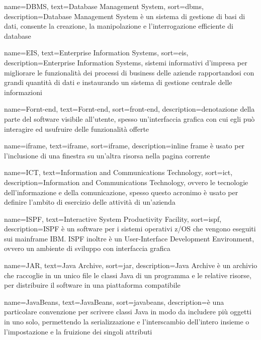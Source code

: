 {
    name=DBMS,
    text=Database Management System,
    sort=dbms,
    description={Database Management System è un sistema di gestione di basi di dati, consente la creazione, la manipolazione e l’interrogazione efficiente di database}
}

{
    name=EIS,
    text=Enterprise Information Systems,
    sort=eis,
    description={Enterprise Information Systems, sistemi informativi d'impresa per migliorare le funzionalità dei processi di business delle aziende rapportandosi con grandi quantità di dati e instaurando un sistema di gestione centrale delle informazioni}
}

{
    name=Fornt-end,
    text=Fornt-end,
    sort=front-end,
    description={denotazione della parte del software visibile all'utente, spesso un'interfaccia grafica con cui egli può interagire ed usufruire delle funzionalità offerte}
}


{
    name=iframe,
    text=iframe,
    sort=iframe,
    description={inline frame è usato per l'inclusione di una finestra su un'altra risorsa nella pagina corrente}
}

{
    name=ICT,
    text=Information and Communications Technology,
    sort=ict,
    description={Information and Communications Technology, ovvero le tecnologie dell’informazione e della comunicazione, spesso questo acronimo è usato per definire l'ambito di esercizio delle attività di un'azienda}
}

{
    name=ISPF,
    text=Interactive System Productivity Facility,
    sort=ispf,
    description={ISPF è un software per i sistemi operativi z/OS che vengono eseguiti sui mainframe IBM. ISPF inoltre è un User-Interface Development Environment, ovvero un ambiente di sviluppo con interfaccia grafica}
}

{
    name=JAR,
    text=Java Archive,
    sort=jar,
    description={Java Archive è un archivio che raccoglie in un unico file le classi Java di un programma e le relative risorse, per distribuire il software in una piattaforma compatibile}
}

{
    name=JavaBeans,
    text=JavaBeans,
    sort=javabeans,
    description={è una particolare convenzione per scrivere classi Java in modo da includere più oggetti in uno solo, permettendo la serializzazione e l'interscambio dell'intero insieme o l'impostazione e la fruizione dei singoli attributi}
}

